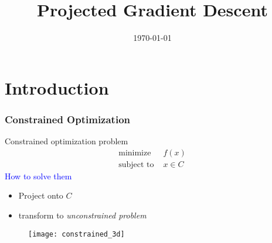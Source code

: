 \documentclass{beamer}
\title{Projected Gradient Descent}
\date{\today}
\begin{document}
\maketitle
\frame{\tableofcontents}

\section{Introduction}%



\begin{frame}
  \frametitle{Constrained Optimization}

  \begin{minipage}{0.5\textwidth}
    \begin{block}{Constrained optimization problem}
      \begin{equation}
        \begin{aligned}
          \text{minimize} & f(x)\\
          \text{subject to } & x\in C
        \end{aligned}
      \end{equation}
      \textcolor{blue}{How to solve them}
      \begin{itemize}
        \item Project onto $C$
        \item transform to \textit{unconstrained problem}
      \end{itemize}
    \end{block}
  \end{minipage}
  \begin{minipage}{0.45\textwidth}
    \begin{figure}[ht]
      \centering
      \texttt{[image: constrained\_3d]}
    \end{figure}
  \end{minipage}
\end{frame}
\end{document}
